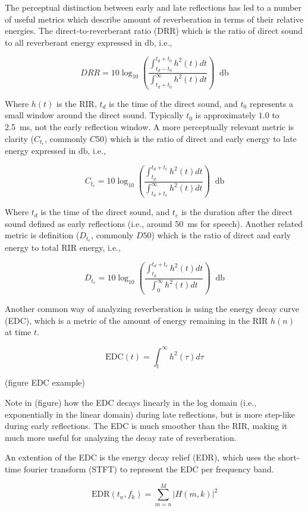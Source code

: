 The perceptual distinction between early and late reflections has led to a number of useful metrics which describe amount of reverberation in terms of their relative energies. The direct-to-reverberant ratio (DRR) which is the ratio of direct sound to all reverberant energy expressed in $\unit{\decibel}$, i.e.,

\[DRR = 10\log_{10}\left(\frac{\int_{t_d-t_0}^{t_d+t_0}h^2(t)dt}{\int_{t_d+t_0}^{\infty}h^2(t)dt}\right)\;\;\unit{\decibel}\]

Where $h(t)$ is the RIR, $t_d$ is the time of the direct sound, and $t_0$ represents a small window around the direct sound. Typically $t_0$ is approximately $1.0$ to \qty{2.5}{\milli\second}, not the early reflection window. A more perceptually relevant metric is clarity ($C_{t_e}$, commonly $C50$) which is the ratio of direct and early energy to late energy expressed in $\unit{\decibel}$, i.e.,

\[C_{t_e} = 10\log_{10}\left(\frac{\int_{t_d}^{t_d+t_e}h^2(t)dt}{\int_{t_d+t_e}^{\infty}h^2(t)dt}\right)\;\;\unit{\decibel}\]


Where $t_d$ is the time of the direct sound, and $t_e$ is the duration after the direct sound defined as early reflections (i.e., around \qty{50}{\milli\second} for speech). Another related metric is definition ($D_{t_e}$, commonly $D50$) which is the ratio of direct and early energy to total RIR energy, i.e.,

\[D_{t_e} = 10\log_{10}\left(\frac{\int_{t_d}^{t_d+t_e}h^2(t)dt}{\int_{0}^{\infty}h^2(t)dt}\right)\;\;\unit{\decibel}\]

Another common way of analyzing reverberation is using the energy decay curve (EDC), which is a metric of the amount of energy remaining in the RIR $h(n)$ at time $t$.

\[\mathrm{EDC}(t)=\int_{t}^{\infty}h^2(\tau)d\tau\]

(figure EDC example)

Note in (figure) how the EDC decays linearly in the log domain (i.e., exponentially in the linear domain) during late reflections, but is more step-like during early reflections. The EDC is much smoother than the RIR, making it much more useful for analyzing the decay rate of reverberation.

An extention of the EDC is the energy decay relief (EDR), which uses the short-time fourier transform (STFT) to represent the EDC per frequency band.

\[\mathrm{EDR}(t_n,f_k)=\sum_{m=n}^{M}|H(m,k)|^2\]

